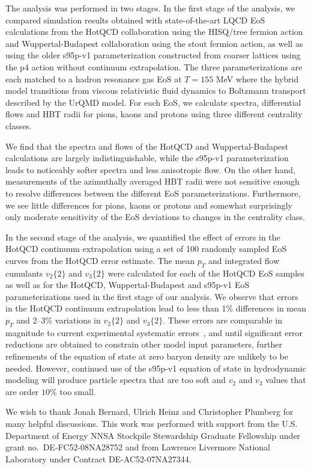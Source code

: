 \documentclass[aps,prc,reprint,amsmath,nofootinbib,superscriptaddress]{revtex4-1}
\begin{document}
The analysis was performed in two stages. In the first stage of the analysis, we compared simulation results obtained with state-of-the-art LQCD EoS calculations from the HotQCD collaboration using the HISQ/tree fermion action and Wuppertal-Budapest collaboration using the stout fermion action, as well as using the older s95p-v1 parameterization constructed from coarser lattices using the p4 action without continuum extrapolation. The three parameterizations are each matched to a hadron resonance gas EoS at $T=155$ MeV where the hybrid model transitions from viscous relativistic fluid dynamics to Boltzmann transport described by the UrQMD model. For each EoS, we calculate spectra, differential flows and HBT radii for pions, kaons and protons using three different centrality classes.

We find that the spectra and flows of the HotQCD and Wuppertal-Budapest calculations are largely indistinguishable, while the s95p-v1 parameterization leads to noticeably softer spectra and less anisotropic flow. On the other hand, measurements of the azimuthally averaged HBT radii were not sensitive enough to resolve differences between the different EoS parameterizations. Furthermore, we see little differences for pions, kaons or protons and somewhat surprisingly only moderate sensitivity of the EoS deviations to changes in the centrality class.

In the second stage of the analysis, we quantified the effect of errors in the HotQCD continuum extrapolation using a set of 100 randomly sampled EoS curves from the HotQCD error estimate. The mean $p_T$ and integrated flow cumulants $v_2\{2\}$ and $v_3\{2\}$ were calculated for each of the HotQCD EoS samples as well as for the HotQCD, Wuppertal-Budapest and s95p-v1 EoS parameterizations used in the first stage of our analysis. We observe that errors in the HotQCD continuum extrapolation lead to less than 1\% differences in mean $p_T$ and 2--3\% variations in $v_2\{2\}$ and $v_3\{2\}$. These errors are comparable in magnitude to current experimental systematic errors~\cite{Adamczyk:2013jh, Adare:2011uo}, and until significant error reductions are obtained to constrain other model input parameters, further refinements of the equation of state at zero baryon density are unlikely to be needed. However, continued use of the s95p-v1 equation of state in hydrodynamic modeling will produce particle spectra that are too soft and $v_2$ and $v_3$ values that are order $10\%$ too small.

\begin{acknowledgments}
We wish to thank Jonah Bernard, Ulrich Heinz and Christopher Plumberg for many helpful discussions.
This work was performed with support from the U.S. Department of Energy NNSA Stockpile Stewardship Graduate Fellowship under grant no.~DE-FC52-08NA28752 and from Lawrence Livermore National Laboratory under Contract DE-AC52-07NA27344.
\end{acknowledgments}


\end{document}
